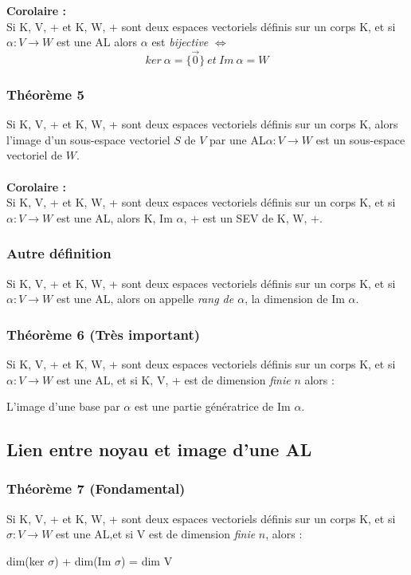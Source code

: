\documentclass[12pt, a4paper]{article}
\begin{document}
\textbf{Corolaire :}\\
Si K, V, + et K, W, + sont deux espaces vectoriels définis sur un corps K,  et si $\alpha : V \rightarrow W$ est une AL alors $\alpha$ est \textit{bijective} $\Leftrightarrow$
$$ker\ \alpha = \{\vec{0}\}\ et\ Im\ \alpha = W$$

\subsubsection{Théorème 5}
Si K, V, + et K, W, + sont deux espaces vectoriels définis sur un corps K, alors l'image d'un sous-espace vectoriel $S$ de $V$ par une AL$\alpha : V \rightarrow W$ est un sous-espace vectoriel de $W$.
\\\\
\textbf{Corolaire :}\\
Si K, V, + et K, W, + sont deux espaces vectoriels définis sur un corps K,  et si $\alpha : V \rightarrow W$ est une AL, alors K, Im $\alpha$, + est un SEV de K, W, +.

\subsubsection{Autre définition}
Si K, V, + et K, W, + sont deux espaces vectoriels définis sur un corps K,  et si $\alpha : V \rightarrow W$ est une AL, alors on appelle \textit{rang de $\alpha$}, la dimension de Im $\alpha$.

\subsubsection{Théorème 6 (Très important)}
Si K, V, + et K, W, + sont deux espaces vectoriels définis sur un corps K,  et si $\alpha : V \rightarrow W$ est une AL, et si K, V, + est de dimension \textit{finie} $n$ alors :
\begin{center}
L'image d'une base par $\alpha$ est une partie génératrice de Im $\alpha$.
\end{center}

\subsection{Lien entre noyau et image d'une AL}
\subsubsection{Théorème 7 (Fondamental)}
Si K, V, + et K, W, + sont deux espaces vectoriels définis sur un corps K,  et si $\sigma : V \rightarrow W$ est une AL,et si V est de dimension \textit{finie} $n$, alors :
\begin{center}
dim(ker $\sigma$) + dim(Im $\sigma$) = dim V
\end{center}
\end{document}
